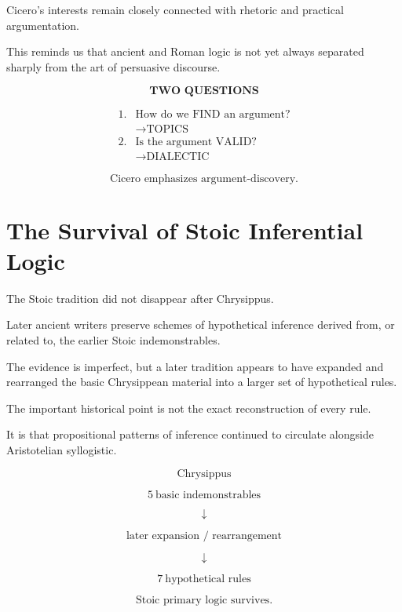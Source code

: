 \documentclass[11pt]{article}
\begin{document}
Cicero's interests remain closely connected with rhetoric and
practical argumentation.

This reminds us that ancient and Roman logic is not yet always
separated sharply from the art of persuasive discourse.

\begin{whiteboard}
\[
\textbf{TWO QUESTIONS}
\]

\[
\begin{array}{ll}
1. & \text{How do we FIND an argument?}\\
   & \rightarrow \text{TOPICS}\\[0.6em]
2. & \text{Is the argument VALID?}\\
   & \rightarrow \text{DIALECTIC}
\end{array}
\]

\[
\boxed{\text{Cicero emphasizes argument-discovery.}}
\]
\end{whiteboard}

\section{The Survival of Stoic Inferential Logic}

The Stoic tradition did not disappear after Chrysippus.

Later ancient writers preserve schemes of hypothetical inference
derived from, or related to, the earlier Stoic indemonstrables.

The evidence is imperfect, but a later tradition appears to have
expanded and rearranged the basic Chrysippean material into a
larger set of hypothetical rules.

The important historical point is not the exact reconstruction of
every rule.

It is that propositional patterns of inference continued to
circulate alongside Aristotelian syllogistic.

\begin{whiteboard}
\[
\text{Chrysippus}
\]

\[
5\ \text{basic indemonstrables}
\]

\[
\downarrow
\]

\[
\text{later expansion / rearrangement}
\]

\[
\downarrow
\]

\[
7\ \text{hypothetical rules}
\]

\[
\boxed{\text{Stoic primary logic survives.}}
\]
\end{whiteboard}
\end{document}

